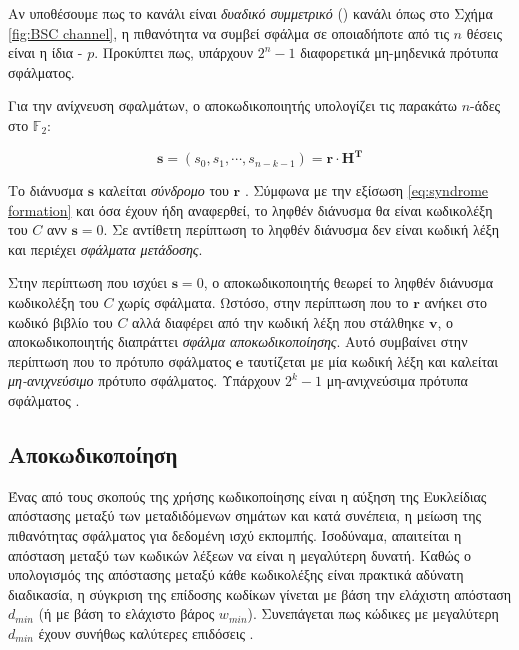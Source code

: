 Αν υποθέσουμε πως το κανάλι είναι \textit{δυαδικό συμμετρικό} () κανάλι όπως στο Σχήμα \ref{fig:BSC channel}, η πιθανότητα να συμβεί σφάλμα σε οποιαδήποτε από τις $n$ θέσεις είναι η ίδια - $p$. Προκύπτει πως, υπάρχουν $2^n-1$ διαφορετικά μη-μηδενικά πρότυπα σφάλματος. 

Για την ανίχνευση σφαλμάτων, ο αποκωδικοποιητής υπολογίζει τις παρακάτω $n$-άδες στο $\mathbb{F}_2$:

\begin{equation}
\mathbf{s} = \left(s_0, s_1, \cdots, s_{n-k-1}\right) = \mathbf{r}\cdot\mathbf{H^T}
\label{eq:syndrome formation}
\end{equation}

Το διάνυσμα $\mathbf{s}$ καλείται \textit{σύνδρομο} του $\mathbf{r}$ \cite{ryan2009channel}. Σύμφωνα με την εξίσωση \ref{eq:syndrome formation} και όσα έχουν ήδη αναφερθεί, το ληφθέν διάνυσμα θα είναι κωδικολέξη του $C$ ανν $\mathbf{s}=0$. Σε αντίθετη περίπτωση το ληφθέν διάνυσμα δεν είναι κωδική λέξη και περιέχει \textit{σφάλματα μετάδοσης}.

Στην περίπτωση που ισχύει $\mathbf{s}=0$, ο αποκωδικοποιητής θεωρεί το ληφθέν διάνυσμα κωδικολέξη του $C$ χωρίς σφάλματα. Ωστόσο, στην περίπτωση που το $\mathbf{r}$ ανήκει στο κωδικό βιβλίο του $C$ αλλά διαφέρει από την κωδική λέξη που στάλθηκε $\mathbf{v}$, ο αποκωδικοποιητής διαπράττει \textit{σφάλμα αποκωδικοποίησης}. Αυτό συμβαίνει στην περίπτωση που το πρότυπο σφάλματος $\mathbf{e}$ ταυτίζεται με μία κωδική λέξη και καλείται \textit{μη-ανιχνεύσιμο} πρότυπο σφάλματος. Υπάρχουν $2^k-1$ μη-ανιχνεύσιμα πρότυπα σφάλματος \cite{macwilliams1977theory}.

\subsection{Αποκωδικοποίηση}

Ένας από τους σκοπούς της χρήσης κωδικοποίησης είναι η αύξηση της Ευκλείδιας απόστασης μεταξύ των μεταδιδόμενων σημάτων και κατά συνέπεια, η μείωση της πιθανότητας σφάλματος για δεδομένη ισχύ εκπομπής. Ισοδύναμα, απαιτείται η απόσταση  μεταξύ των κωδικών λέξεων να είναι η μεγαλύτερη δυνατή. Καθώς ο υπολογισμός της απόστασης  μεταξύ κάθε κωδικολέξης είναι πρακτικά αδύνατη διαδικασία, η σύγκριση της επίδοσης κωδίκων γίνεται με βάση την ελάχιστη απόσταση $d_{min}$ (ή με βάση το ελάχιστο βάρος $w_{min}$). Συνεπάγεται πως κώδικες με μεγαλύτερη $d_{min}$ έχουν συνήθως καλύτερες επιδόσεις \cite{proakis1994communication}.

